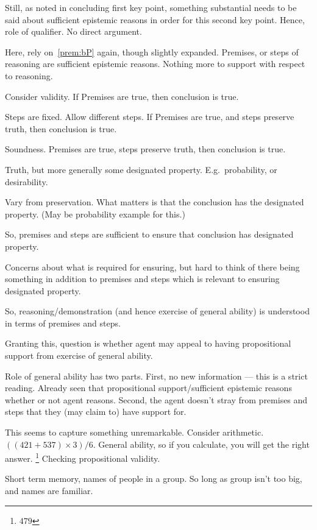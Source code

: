 \begin{note}
  Still, as noted in concluding first key point, something substantial needs to be said about sufficient epistemic reasons in order for this second key point.
  Hence, role of qualifier.
  No direct argument.

  Here, rely on~\ref{prem:bP} again, though slightly expanded.
  Premises, or steps of reasoning are sufficient epistemic reasons.
  Nothing more to support with respect to reasoning.

  Consider validity.
  If Premises are true, then conclusion is true.

  Steps are fixed.
  Allow different steps.
  If Premises are true, and steps preserve truth, then conclusion is true.

  Soundness.
  Premises are true, steps preserve truth, then conclusion is true.

  Truth, but more generally some designated property.
  E.g.\ probability, or desirability.

  Vary from preservation.
  What matters is that the conclusion has the designated property.
  (May be probability example for this.)

  So, premises and steps are sufficient to ensure that conclusion has designated property.

  Concerns about what is required for ensuring, but hard to think of there being something in addition to premises and steps which is relevant to ensuring designated property.

  So, reasoning/demonstration (and hence exercise of general ability) is understood in terms of premises and steps.

  Granting this, question is whether agent may appeal to having propositional support from exercise of general ability.

  Role of general ability has two parts.
  First, no new information --- this is a strict reading.
  Already seen that propositional support/sufficient epistemic reasons whether or not agent reasons.
  Second, the agent doesn't stray from premises and steps that they (may claim to) have support for.

  This seems to capture something unremarkable.
  Consider arithmetic.
  \(((421 + 537) \times 3)/6\).
  General ability, so if you calculate, you will get the right answer.\nolinebreak
  \footnote{
    \(479\)
  }
  Checking propositional validity.

  Short term memory, names of people in a group.
  So long as group isn't too big, and names are familiar.


\end{note}
